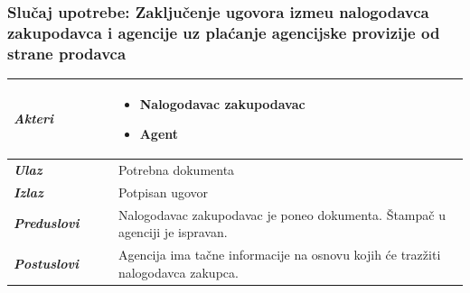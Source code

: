 \documentclass[20pt]{article}
\begin{document}
\newpage
{}
\setlength{\parindent}{1cm}
\fontsize{13}{18} \selectfont

\subsubsection{\bfseries \large Slu\v{c}aj upotrebe: Zaklju\v {c}enje ugovora izme\dj u nalogodavca zakupodavca i agencije uz pla\' canje agencijske provizije od strane prodavca}
\begin{center}
\begin{longtable}{p{0.23\linewidth} p{0.77\linewidth}}
 \hline
 {\it \bfseries Akteri} & \begin{itemize}
    \item Nalogodavac zakupodavac
    \item Agent
\end{itemize}\\
\hline

 {\it \bfseries Ulaz} & Potrebna dokumenta\\
 \hline
 
 {\it \bfseries Izlaz} & Potpisan ugovor\\
 \hline
 
 {\it \bfseries Preduslovi} & Nalogodavac zakupodavac je poneo dokumenta. \v {S}tampa\v {c} u agenciji je ispravan.  \\
 \hline
 
 {\it \bfseries Postuslovi} & Agencija ima ta\v {c}ne informacije na osnovu kojih \' ce traz\v {z}iti nalogodavca zakupca. \\
 \hline


\end{longtable}
\end{center}
\end{document}

